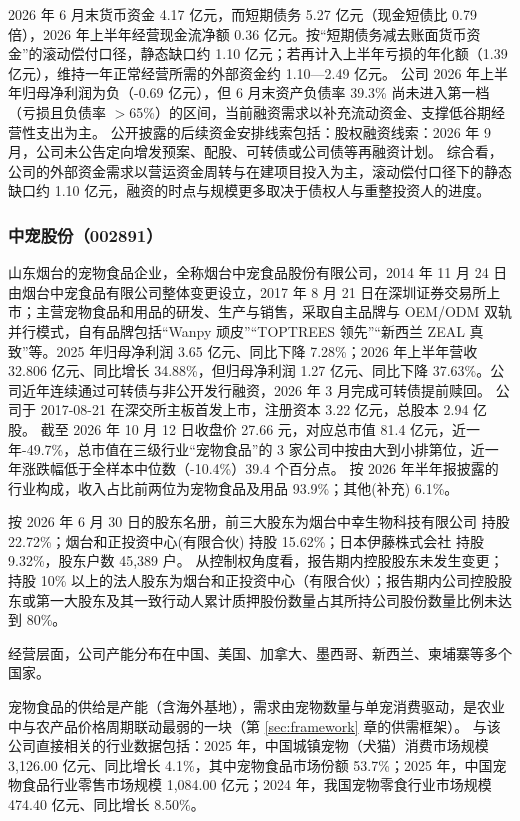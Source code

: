  2026 年 6 月末货币资金 4.17 亿元，而短期债务 5.27 亿元（现金短债比 0.79 倍），2026 年上半年经营现金流净额 0.36 亿元。按“短期债务减去账面货币资金”的滚动偿付口径，静态缺口约 1.10 亿元；若再计入上半年亏损的年化额（1.39 亿元），维持一年正常经营所需的外部资金约 1.10---2.49 亿元。 公司 2026 年上半年归母净利润为负（-0.69 亿元），但 6 月末资产负债率 39.3\% 尚未进入第一档（亏损且负债率 $>$65\%）的区间，当前融资需求以补充流动资金、支撑低谷期经营性支出为主。 公开披露的后续资金安排线索包括：股权融资线索：2026 年 9 月，公司未公告定向增发预案、配股、可转债或公司债等再融资计划。 综合看，公司的外部资金需求以营运资金周转与在建项目投入为主，滚动偿付口径下的静态缺口约 1.10 亿元，融资的时点与规模更多取决于债权人与重整投资人的进度。




\subsubsection{中宠股份（002891）}
\label{co:002891}

 山东烟台的宠物食品企业，全称烟台中宠食品股份有限公司，2014 年 11 月 24 日由烟台中宠食品有限公司整体变更设立，2017 年 8 月 21 日在深圳证券交易所上市；主营宠物食品和用品的研发、生产与销售，采取自主品牌与 OEM/ODM 双轨并行模式，自有品牌包括“Wanpy 顽皮”“TOPTREES 领先”“新西兰 ZEAL 真致”等。2025 年归母净利润 3.65 亿元、同比下降 7.28\%；2026 年上半年营收 32.806 亿元、同比增长 34.88\%，但归母净利润 1.27 亿元、同比下降 37.63\%。公司近年连续通过可转债与非公开发行融资，2026 年 3 月完成可转债提前赎回。 公司于 2017-08-21 在深交所主板首发上市，注册资本 3.22 亿元，总股本 2.94 亿股。 截至 2026 年 10 月 12 日收盘价 27.66 元，对应总市值 81.4 亿元，近一年-49.7\%，总市值在三级行业“宠物食品”的 3 家公司中按由大到小排第位，近一年涨跌幅低于全样本中位数（-10.4\%）39.4 个百分点。 按 2026 年半年报披露的行业构成，收入占比前两位为宠物食品及用品 93.9\%；其他(补充) 6.1\%。

 按 2026 年 6 月 30 日的股东名册，前三大股东为烟台中幸生物科技有限公司 持股 22.72\%；烟台和正投资中心(有限合伙) 持股 15.62\%；日本伊藤株式会社 持股 9.32\%，股东户数 45,389 户。 从控制权角度看，报告期内控股股东未发生变更；持股 10\% 以上的法人股东为烟台和正投资中心（有限合伙）；报告期内公司控股股东或第一大股东及其一致行动人累计质押股份数量占其所持公司股份数量比例未达到 80\%。

 经营层面，公司产能分布在中国、美国、加拿大、墨西哥、新西兰、柬埔寨等多个国家。

 宠物食品的供给是产能（含海外基地），需求由宠物数量与单宠消费驱动，是农业中与农产品价格周期联动最弱的一块（第 \ref{sec:framework} 章的供需框架）。 与该公司直接相关的行业数据包括：2025 年，中国城镇宠物（犬猫）消费市场规模 3,126.00 亿元、同比增长 4.1\%，其中宠物食品市场份额 53.7\%；2025 年，中国宠物食品行业零售市场规模 1,084.00 亿元；2024 年，我国宠物零食行业市场规模 474.40 亿元、同比增长 8.50\%。

